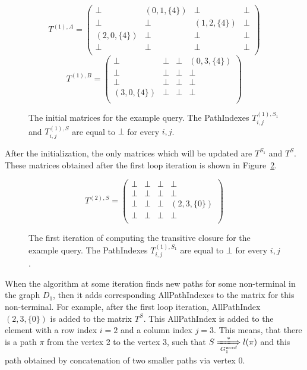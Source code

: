 {\footnotesize
	\begin{figure}[h]
		\[
		T^{(1),A} = \begin{pmatrix}
			\bot & (0,1,\{4\})       & \bot & \bot       \\
			\bot & \bot & (1,2,\{4\})       & \bot \\
			(2,0,\{4\})       & \bot & \bot & \bot \\
			\bot       & \bot & \bot & \bot \\
		\end{pmatrix}
		\]
		\[
		T^{(1),B} = \begin{pmatrix}
			\bot & \bot       & \bot & (0,3,\{4\})       \\
			\bot & \bot & \bot       & \bot \\
			\bot       & \bot & \bot & \bot \\
			(3,0,\{4\})      & \bot & \bot & \bot \\
		\end{pmatrix}
		\]
		\caption{The initial matrices for the example query. The PathIndexes $T^{(1),S_1}_{i,j}$ and $T^{(1),S}_{i,j}$ are equal to $\bot$ for every $i,j$.}
		\label{ExampleQueryInitMatrix}
	\end{figure}
}

After the initialization, the only matrices which will be updated are $T^{S_1}$ and $T^{S}$. These matrices obtained after the first loop iteration is shown in Figure~\ref{ExampleQueryFirstIteration}.

{\footnotesize
	\begin{figure}[h]
		\[
		T^{(2),S} = \begin{pmatrix}
			\bot & \bot       & \bot & \bot       \\
			\bot & \bot & \bot       & \bot \\
			\bot       & \bot & \bot & (2,3,\{0\}) \\
			\bot       & \bot & \bot & \bot \\
		\end{pmatrix}
		\]
		\caption{The first iteration of computing the transitive closure for the example query. The PathIndexes $T^{(1),S_1}_{i,j}$ are equal to $\bot$ for every $i,j$.}
		\label{ExampleQueryFirstIteration}
	\end{figure}
}

When the algorithm at some iteration finds new paths for some non-terminal in the graph $D_1$, then it adds corresponding AllPathIndexes to the matrix for this non-terminal. For example, after the first loop iteration, AllPathIndex $(2,3,\{0\})$ is added to the matrix $T^{S}$. This AllPathIndex is added to the element with a row index $i = 2$ and a column index $j = 3$. This means, that there is a path $\pi$ from the vertex 2 to the vertex 3, such that $S \xLongrightarrow[G_1^{\text{wcnf}}]{*} l(\pi)$ and this path obtained by concatenation of two smaller paths via vertex 0.

